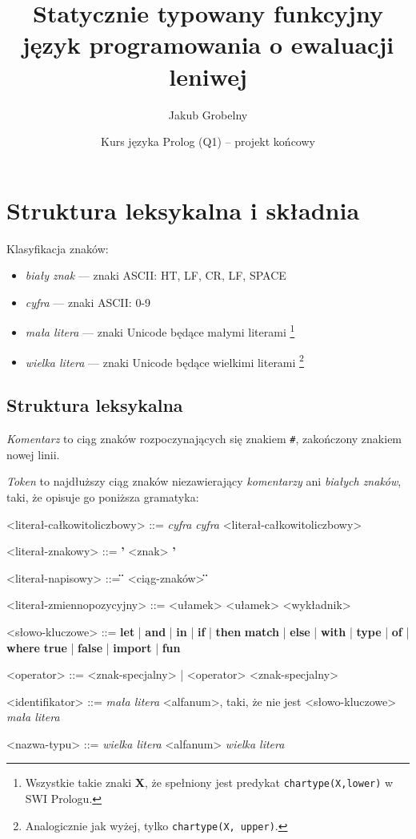 \documentclass[12pt]{article}
\title{\huge
    \textbf{Statycznie typowany funkcyjny język programowania o ewaluacji leniwej}}
\date {Kurs języka Prolog (Q1) -- projekt końcowy}
\author{\Large Jakub Grobelny}
\begin{document}
\maketitle

\section{Struktura leksykalna i składnia}

Klasyfikacja znaków:
\begin{itemize}
    \item \textit{biały znak} --- znaki ASCII: HT, LF, CR, LF, SPACE
    \item \textit{cyfra} --- znaki ASCII: 0-9
    \item \textit{mała litera} --- znaki Unicode będące małymi literami 
    \footnote{Wszystkie takie znaki \textbf{X}, że spełniony jest predykat 
        \texttt{char\textunderscore type(X,lower)} w SWI Prologu.}
    \item \textit{wielka litera} --- znaki Unicode będące wielkimi literami
    \footnote{Analogicznie jak wyżej, tylko 
        \texttt{char\textunderscore type(X, upper)}.}
\end{itemize}

\subsection{Struktura leksykalna}

\textit{Komentarz} to ciąg znaków rozpoczynających się znakiem \texttt{\#}, 
zakończony znakiem nowej linii.

\textit{Token} to najdłuższy ciąg znaków niezawierający \textit{komentarzy} ani 
\textit{białych znaków}, taki, że opisuje go poniższa gramatyka:

\begin{grammar}

<literał-całkowitoliczbowy> ::=
    \textit{cyfra} 
    \alt \textit{cyfra} <literał-całkowitoliczbowy>

<literał-znakowy> ::=
    \textbf{'} <znak> \textbf{'}

<literał-napisowy> ::=
    \textbf{\"} <ciąg-znaków> \textbf{\"}

<literał-zmiennopozycyjny> ::=
    <ułamek>
    \alt <ułamek> <wykładnik>

<słowo-kluczowe> ::=
    \textbf{let}
    | \textbf{and}
    | \textbf{in}
    | \textbf{if}
    | \textbf{then}
    \alt \textbf{match}
    | \textbf{else}
    | \textbf{with}
    | \textbf{type}
    | \textbf{of}
    | \textbf{where}
    \alt \textbf{true}
    | \textbf{false}
    | \textbf{import}
    | \textbf{fun}

<operator> ::= <znak-specjalny> | <operator> <znak-specjalny>

<identifikator> ::= 
    \textit{mała litera} <alfanum>, taki, że nie jest <słowo-kluczowe>
    \alt \textit{mała litera}

<nazwa-typu> ::=
    \textit{wielka litera} <alfanum>
    \alt \textit{wielka litera}

\end{grammar}
\end{document}
